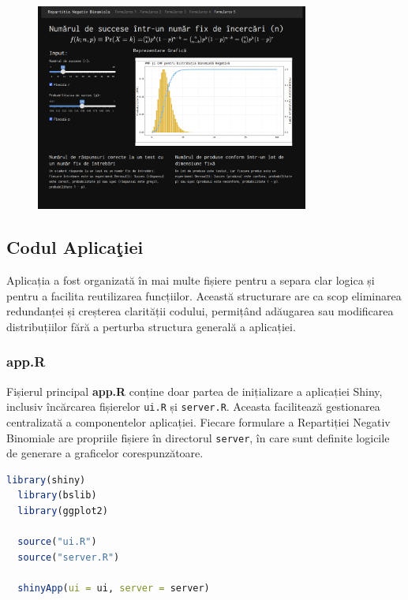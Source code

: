 \documentclass[a4paper,11pt]{article}
\begin{document}
\begin{figure}[h!]
  \centering
  \includegraphics[width=0.8\textwidth]{./img/8.png}
  \label{fig:imaginea_ta_8}
\end{figure}
\newpage

\subsection*{Codul Aplica\c{t}iei}

Aplicația a fost organizată în mai multe fișiere pentru a separa clar logica și pentru a facilita reutilizarea funcțiilor. Această structurare are ca scop eliminarea redundanței și creșterea clarității codului, permițând adăugarea sau modificarea distribuțiilor fără a perturba structura generală a aplicației.
\subsubsection*{app.R}

Fișierul principal \textbf{app.R} conține doar partea de inițializare a aplicației Shiny, inclusiv încărcarea fișierelor \texttt{ui.R} și \texttt{server.R}. Aceasta facilitează gestionarea centralizată a componentelor aplicației.
Fiecare formulare a Repartiției Negativ Binomiale are propriile fișiere în directorul \texttt{server}, în care sunt definite logicile de generare a graficelor corespunzătoare.

\begin{lstlisting}[language=R]
  library(shiny)
  library(bslib)
  library(ggplot2)
  
  source("ui.R")
  source("server.R")
  
  shinyApp(ui = ui, server = server)
\end{lstlisting}
\end{document}
